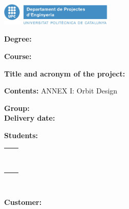 
\thispagestyle{CoverPage}

\includegraphics[width=0.4\textwidth]{./doc_config/images/UPC_ProjectesEng1.png}

\hspace{30pt} {\scriptsize \textbf{\Seccio}}

\vspace{20pt}

\textbf{Degree:} \Degree

\textbf{Course:} \Course

\vspace{50pt}

\textbf{Title and acronym of the project:}

\hspace{10pt} \ProjectName

\hspace{10pt} \Acronym

\vspace{40pt}

\textbf{Contents:} ANNEX I: Orbit Design

\vspace{20pt}

\textbf{Group:} \GrCode\\

\textbf{Delivery date:} \DocDate\\

\vspace{20pt}

\textbf{Students:}\vspace{7pt}

\begin{tabular}{ll}
	\Studi    \hspace*{30pt} & \Studii   \\
	\Studiii  \hspace*{30pt} & \Studiv   \\
	\Studv    \hspace*{30pt} & \Studvi   \\
	\Studvii  \hspace*{30pt} & \Studviii \\
	\Studix   \hspace*{30pt} & \Studx    \\
	\Studxi   \hspace*{30pt} & \Studxii  \\
	\Studxiii \hspace*{30pt} & \Studxiv  \\
	\Studxv   \hspace*{30pt} & \Studxvi  \\
	\Studxvii  \\
	
\end{tabular}\\

\vspace{15pt}

\textbf{Customer:} \Customer